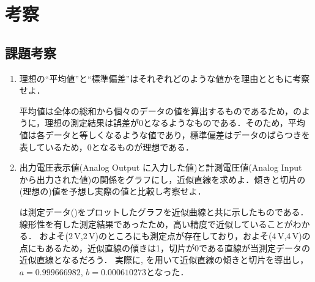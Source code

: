 \clearpage
\section{考察}
\subsection{課題考察}
\begin{enumerate}[実習2-1：]
\item 理想の``平均値''と``標準偏差''はそれぞれどのような値かを理由とともに考察せよ．

平均値は全体の総和から個々のデータの値を算出するものであるため，のように，理想の測定結果は誤差が0となるようなものである．そのため，平均値は各データと等しくなるような値であり，標準偏差はデータのばらつきを表しているため，0となるものが理想である．
\item 出力電圧表示値(Analog Output に入力した値)と計測電圧値(Analog Input から出力された値)の関係をグラフにし，近似直線を求めよ．傾きと切片の(理想の)値を予想し実際の値と比較し考察せよ．

は測定データ()をプロットしたグラフを近似曲線と共に示したものである．線形性を有した測定結果であったため，高い精度で近似していることがわかる．
およそ(2\,\rm{V},2\,\rm{V})のところにも測定点が存在しており，およそ(4\,\rm{V},4\,\rm{V})の点にもあるため，近似直線の傾きは1，切片が0である直線が当測定データの近似直線となるだろう．
実際に, を用いて近似直線の傾きと切片を導出し，$a=0.999666982$, $b=0.000610273$となった．

\begin{table}[h]
\centering
\caption{電圧変化時の諸特性}
\label{tab:syotokusei}
\end{table}


\end{enumerate}
